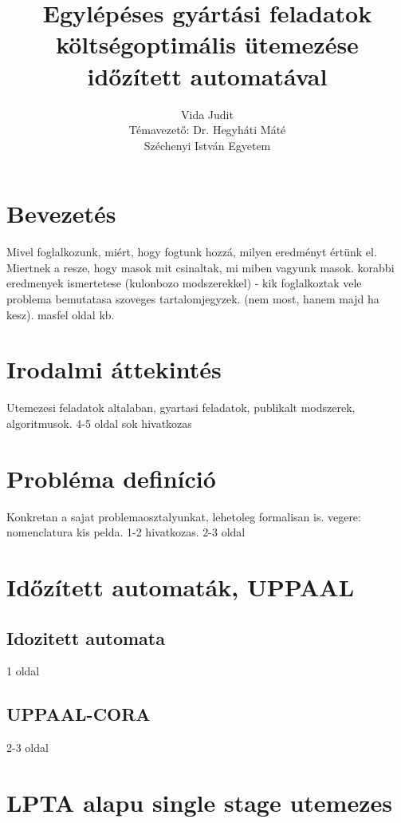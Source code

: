 \documentclass {report}
\begin{document}
\title{Egylépéses gyártási feladatok költségoptimális ütemezése időzített automatával}

\author{Vida Judit\\Témavezető: Dr. Hegyháti Máté\\Széchenyi István Egyetem}
\maketitle


\tableofcontents
\chapter{Bevezetés}
Mivel foglalkozunk,  miért, hogy fogtunk hozzá, milyen eredményt értünk el.
Miertnek a resze, hogy masok mit csinaltak, mi miben vagyunk masok.
korabbi eredmenyek ismertetese (kulonbozo modszerekkel) - kik foglalkoztak vele\\ problema bemutatasa
szoveges tartalomjegyzek. (nem most, hanem majd ha kesz).
masfel oldal kb.

\chapter{Irodalmi áttekintés}
Utemezesi feladatok altalaban, gyartasi feladatok, publikalt modszerek, algoritmusok.
4-5 oldal
sok hivatkozas


\chapter{Probléma definíció}
Konkretan a sajat problemaosztalyunkat, lehetoleg formalisan is.
vegere: nomenclatura
kis pelda.
1-2 hivatkozas.
2-3 oldal

\chapter{Időzített automaták, UPPAAL}
\section{Idozitett automata} 1 oldal
\section{UPPAAL-CORA} 2-3 oldal

\chapter{LPTA alapu single stage utemezes}
\end{document}
